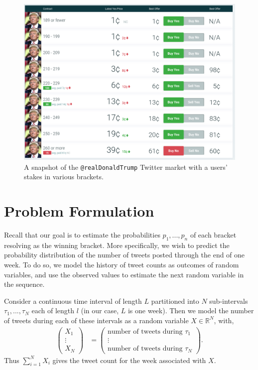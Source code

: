 \documentclass{article}
\begin{document}
\begin{figure}[h!]
    \centering
    \includegraphics[width=1.0\textwidth]{market}
    \caption{A snapshot of the \lstinline{@realDonaldTrump} Twitter market with a users' stakes in various brackets.}
    \label{market_graphic}
\end{figure}

\section{Problem Formulation}
Recall that our goal is to estimate the probabilities $p_1,...,p_n$ of each bracket resolving as the winning bracket. More specifically,
we wish to predict the probability distribution of the number of tweets posted through the end of one week. To do so,
we model the history of tweet counts as outcomes of random variables, and use the observed
values to estimate the next random variable in the sequence.

Consider a continuous time interval of length $L$ partitioned into $N$ sub-intervals
$\tau_1,...,\tau_N$ each of length $l$ (in our case, $L$ is one week). Then we model the number of tweets during each of these intervals
as a random variable $X \in \mathbb{R}^N$, with,
\begin{align*}
\begin{pmatrix}
    X_1\\ \vdots \\X_N
\end{pmatrix}  &= 
\begin{pmatrix}
    \text{number of tweets during } \tau_1
    \\ \vdots \\
    \text{number of tweets during } \tau_N
\end{pmatrix}.
\end{align*}
Thus $\sum_{i=1}^N X_i$ gives the tweet count for the week associated with $X$.
\end{document}

